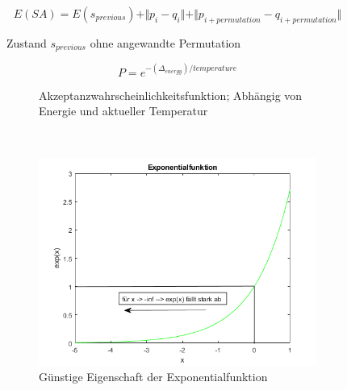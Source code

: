 \newpage

\begin{figure}[H]
  \[ E(SA) = E(s_{previous}) + \Vert{p_{i}-q_{i}}\Vert + \Vert{p_{i 
        + permutation}-q_{i + permutation}}\Vert\]
  \caption{Zustand $s_{previous}$ ohne angewandte Permutation}
  \label{eq:vereinfachte pixel energy function}
\end{figure}


\begin{figure}[H]
    \centering
    \begin{subfigure}[b]{0.4\textwidth}
        \begin{equation}\label{eq:Akzeptanzwahrscheinlichkeitsfunktion}
            P = e^{-(\Delta_{energy})/ temperature}
        \end{equation}
        \caption{Akzeptanzwahrscheinlichkeitsfunktion; Abhängig von Energie und aktueller Temperatur}
    \end{subfigure}
    ~ %
    \begin{subfigure}[b]{0.7\textwidth}
        \centering \includegraphics[interpolate=false,width=\linewidth]{content/simulatedAnnealing/Bilder/exponentialfunktion_as_PDF.png}
        \caption{Günstige Eigenschaft der Exponentialfunktion}
        \label{fig:Exponentialfunktion}
    \end{subfigure}
    \caption{}
\end{figure}

